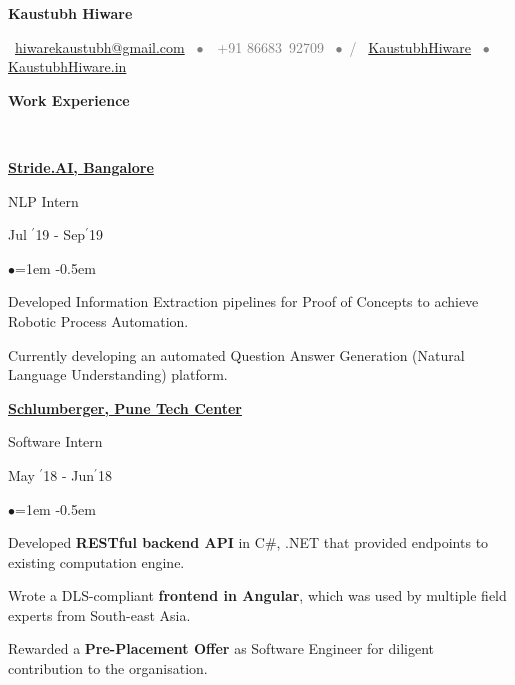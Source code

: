 \documentclass[11pt, a4paper]{resume}
\newcommand{\important}[1]{
	\textcolor{mypurple}{#1}
}
\newcommand{\greyed}[1]{
	\textcolor{gray}{#1}
}
\newcommand{\titleX}[1]{
	\begin{LARGE}
    	\important{\centerline{\textbf{#1}}}
    \end{LARGE}
}
\newcommand{\fillit}[1]{
	\leavevmode\xleaders\hbox{#1}\hfill\kern0pt
}
\newcommand{\sectionTitle}[1]{
	\begin{Large}
    	\important{\textbf{#1}} 
    \end{Large}
    \important{\rlap{\rule[.5ex]{\linegoal}{0.5pt}}{}}
     \vspace{0.1em}\\
}
\newcommand{\textbox}[1]{
  \parbox{.333\textwidth}{#1}
}
\newenvironment{Jobsection}[3]{ %
\noindent\textbox{\bf #1\hfill}\textbox{\hfil #2\hfil}\textbox{\hfill #3}
  \begin{list}{$\bullet$}{\leftmargin=1em} %
   \itemsep -0.5em \vspace{-0.5em} %
  }{
  \end{list}
  \vspace{0.2em} %
}
\begin{document}
\titleX{Kaustubh Hiware}
\normalsize
\vspace{6pt}
\greyed{\centerline{\faEnvelopeO \, \href{mailto:hiwarekaustubh@gmail.com}{ hiwarekaustubh@gmail.com} \, $\bullet$ \,\faMobile\, +91 86683\, 92709 \, $\bullet$ \,\faGithub / \faLinkedin \, \href{https://github.com/kaustubhhiware}{KaustubhHiware} \,  $\bullet$ \, \faGlobe \, \href{https://kaustubhhiware.in}{KaustubhHiware.in}}}

\vspace{-2em}
\sectionTitle{Work Experience}
\begin{Jobsection}{\href{https://stride.ai}{Stride.AI, Bangalore}}{NLP Intern}{ Jul $^{\prime}$19 - Sep$^{\prime}$19}
\item Developed Information Extraction pipelines for Proof of Concepts to achieve Robotic Process Automation.
\item Currently developing an automated Question Answer Generation (Natural Language Understanding) platform.
\end{Jobsection}

\begin{Jobsection}{\href{https://drive.google.com/file/d/1EcfIC_g8bx3whaxMdOkFyZx4TCqA1RAq/view?usp=sharing}{Schlumberger, Pune Tech Center}}{Software Intern}{ May $^{\prime}$18 - Jun$^{\prime}$18}
\item Developed {\bf RESTful backend API} in C\#, .NET that provided endpoints to existing computation engine.
\item Wrote a DLS-compliant {\bf frontend in Angular}, which was used by multiple field experts from South-east Asia.
\item Rewarded a {\bf Pre-Placement Offer} as Software Engineer for diligent contribution to the organisation.
\end{Jobsection}

\end{document}
